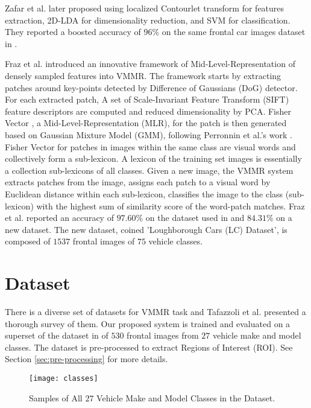 Zafar et al. \citep{zafar2009localized} later proposed using localized Contourlet transform for features extraction, 2D-LDA for dimensionality reduction, and SVM for classification.
They reported a boosted accuracy of $96\%$ on the same frontal car images dataset in \citep{zafar2007two}.


Fraz et al. \citep{fraz2014mid} introduced an innovative framework of Mid-Level-Representation of densely sampled features into VMMR.
The framework starts by extracting patches around key-points detected by Difference of Gaussians (DoG) detector.
For each extracted patch, A set of Scale-Invariant Feature Transform (SIFT) \citep{lowe2004distinctive} feature descriptors are computed and reduced dimensionality by PCA.
Fisher Vector \citep{jaakkola1999exploiting}, a Mid-Level-Representation (MLR), for the patch is then generated based on Gaussian Mixture Model (GMM), following Perronnin et al.'s work \citep{perronnin2010improving}.
Fisher Vector for patches in images within the same class are visual words and collectively form a sub-lexicon.
A lexicon of the training set images is essentially a collection sub-lexicons of all classes.
Given a new image, the VMMR system 
extracts patches from the image, 
assigns each patch to a visual word by Euclidean distance within each sub-lexicon, 
classifies the image to the class (sub-lexicon) with the highest sum of similarity score of the word-patch matches.
Fraz et al. reported an accuracy of $97.60\%$ on the dataset used in \citep{zafar2009localized} and $84.31\%$ on a new dataset. The new dataset, coined 'Loughborough Cars (LC) Dataset', is composed of $1537$ frontal images of $75$ vehicle classes.


\section{Dataset}
\label{sec:dataset}
There is a diverse set of datasets for VMMR task and Tafazzoli et al. \citep{tafazzoli2017large} presented a thorough survey of them.
Our proposed system is trained and evaluated on a superset of the dataset in \citep{zafar2007two,zafar2009localized,fraz2014mid} of $530$ frontal images from $27$ vehicle make and model classes.
The dataset is pre-processed to extract Regions of Interest (ROI). See Section \ref{sec:pre-processing} for more details.

\begin{figure}
\centering
\texttt{[image: classes]}
\caption{Samples of All $27$ Vehicle Make and Model Classes in the Dataset.}
\label{fig:classes}
\end{figure}

